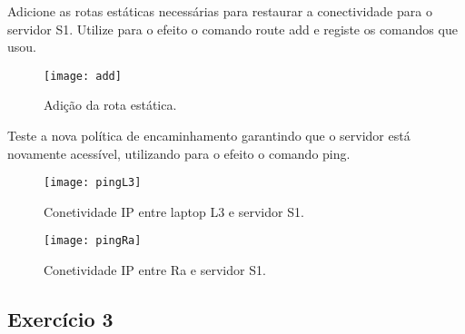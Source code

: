 \documentclass{exam}
\begin{document}
\begin{questions}
\question Adicione as	rotas estáticas	necessárias para restaurar a conectividade	
para o servidor S1. Utilize	para o efeito o	comando	route add e	registe	os comandos que	
usou.
\begin{solution}
\begin{figure}[H]
\centering\texttt{[image: add]} 
\caption{\label{fig:controller}Adição da rota estática.}
\end{figure} 
\end{solution}

\question Teste a nova política de encaminhamento garantindo que o servidor está
novamente acessível, utilizando	para o efeito o	comando	ping. 
\begin{solution}
\begin{figure}[H]
\centering\texttt{[image: pingL3]} 
\caption{\label{fig:controller}Conetividade IP entre laptop L3 e servidor S1.}
\end{figure} 
\begin{figure}[H]
\centering\texttt{[image: pingRa]} 
\caption{\label{fig:controller}Conetividade IP entre Ra e servidor S1.}
\end{figure} 
\end{solution}

\end{questions}

\subsection{Exercício 3}
\end{document}
